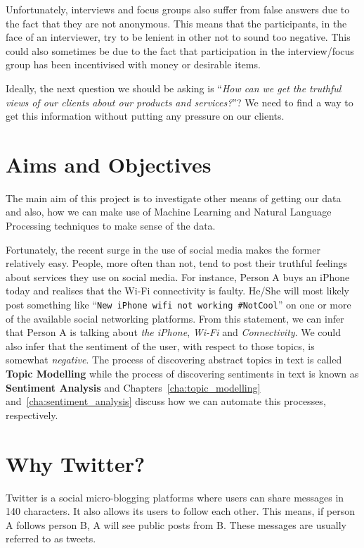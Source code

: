 Unfortunately, interviews and focus groups also suffer from false answers due to the fact that they
are not anonymous. This means that the participants, in the face of an interviewer, try to be
lenient in other not to sound too negative. This could also sometimes be due to the fact that
participation in the interview/focus group has been incentivised with money or desirable items.

Ideally, the next question we should be asking is ``\textit{How can we get the truthful views of our
clients about our products and services?}''? We need to find a way to get this information without
putting any pressure on our clients.

\section{Aims and Objectives}
\label{sec:objectives}
The main aim of this project is to investigate other means of getting our data and also, how we can
make use of Machine Learning and Natural Language Processing techniques to make sense of the data.

Fortunately, the recent surge in the use of social media makes the former relatively easy. People,
more often than not, tend to post their truthful feelings about services they use on social media.
For instance, Person A buys an iPhone today and realises that the Wi-Fi connectivity is faulty.
He/She will most likely post something like ``\texttt{New iPhone wifi not working \#NotCool}'' on
one or more of the available social networking platforms. From this statement, we can infer that
Person A is talking about \textit{the iPhone}, \textit{Wi-Fi} and \textit{Connectivity}. We could
also infer that the sentiment of the user, with respect to those topics, is somewhat
\textit{negative}. The process of discovering abstract topics in text is called \textbf{Topic
Modelling} while the process of discovering sentiments in text is known as \textbf{Sentiment
Analysis} and Chapters~\ref{cha:topic_modelling} and~\ref{cha:sentiment_analysis} discuss how we can
automate this processes, respectively.

\section{Why Twitter?}
Twitter is a social micro-blogging platforms where users can share messages in 140 characters. It
also allows its users to follow each other. This means, if person A follows person B, A will see
public posts from B. These messages are usually referred to as tweets.

